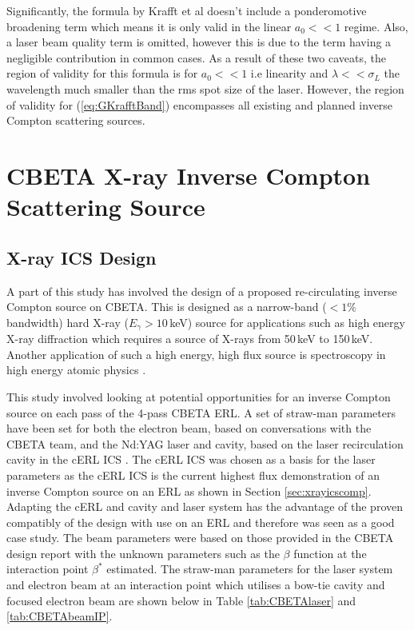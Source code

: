 \documentclass[11pt]{article}
\begin{document}
Significantly, the formula by Krafft et al doesn't include a ponderomotive broadening term which means it is only valid in the linear $a_{0} << 1$ regime. Also, a laser beam quality term is omitted, however this is due to the term having a negligible contribution in common cases. As a result of these two caveats, the region of validity for this formula is for $a_{0} << 1$ i.e linearity and $\lambda << \sigma_{L}$ the wavelength much smaller than the rms spot size of the laser. However, the region of validity for (\ref{eq:GKrafftBand}) encompasses all existing and planned inverse Compton scattering sources.       

\section{CBETA X-ray Inverse Compton Scattering Source}

\subsection{X-ray ICS Design}
\label{sec:CBETAICSdesign}

A part of this study has involved the design of a proposed re-circulating inverse Compton source on CBETA. This is designed as a narrow-band ($<1\%$ bandwidth) hard X-ray ($E_{\gamma} > 10$\,keV) source for applications such as high energy X-ray diffraction which requires a source of X-rays from 50\,keV to 150\,keV. Another application of such a high energy, high flux source is spectroscopy in high energy atomic physics \cite{KirstenIPAC}.

This study involved looking at potential opportunities for an inverse Compton source on each pass of the 4-pass CBETA ERL. A set of straw-man parameters have been set for both the electron beam, based on conversations with the CBETA team, and the Nd:YAG laser and cavity, based on the laser recirculation cavity in the cERL ICS \cite{TAkagicERL}. The cERL ICS was chosen as a basis for the laser parameters as the cERL ICS is the current highest flux demonstration of an inverse Compton source on an ERL as shown in Section \ref{sec:xrayicscomp}. Adapting the cERL and cavity and laser system has the advantage of the proven compatibly of the design with use on an ERL and therefore was seen as a good case study. The beam parameters were based on those provided in the CBETA design report \cite{CBETATDR} with the unknown parameters such as the $\beta$ function at the interaction point $\beta^{*}$ estimated. The straw-man parameters for the laser system and electron beam at an interaction point which utilises a bow-tie cavity and focused electron beam are shown below in Table \ref{tab:CBETAlaser} and \ref{tab:CBETAbeamIP}.
\end{document}
